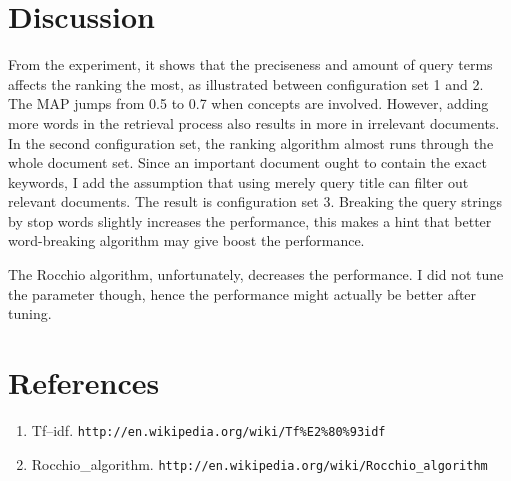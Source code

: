 \documentclass{article}
\begin{document}
\section{Discussion}
From the experiment, it shows that the preciseness and amount of query terms affects the ranking
the most, as illustrated between configuration set 1 and 2. The MAP jumps from 0.5 to 0.7 when
concepts are involved. However, adding more words in the retrieval process also results in more
in irrelevant documents. In the second configuration set, the ranking algorithm almost runs through
the whole document set. Since an important document ought to contain the exact keywords, I add the
assumption that using merely query title can filter out relevant documents. The result is configuration
set 3. Breaking the query strings by stop words slightly increases the performance, this makes a hint
that better word-breaking algorithm may give boost the performance.

The Rocchio algorithm, unfortunately, decreases the performance. I did not tune the parameter though,
hence the performance might actually be better after tuning.
\section{References}
\begin{enumerate}
\item Tf--idf. \texttt{http://en.wikipedia.org/wiki/Tf\%E2\%80\%93idf}
\item Rocchio\_algorithm. \texttt{http://en.wikipedia.org/wiki/Rocchio\_algorithm}
\end{enumerate}
\end{document}
